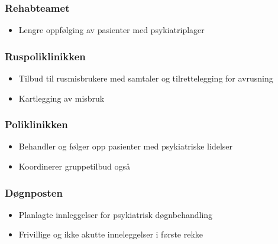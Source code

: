 \documentclass[11pt]{report} %
\begin{document}
                        \subsubsection{Rehabteamet}\label{sec:org_kdps_rehabliltering}
                          \begin{itemize}
                            \item Lengre oppfølging av pasienter med psykiatriplager\\
                          \end{itemize}
                        \subsubsection{Ruspoliklinikken}\label{sec:org_kdps_ruspol}
                          \begin{itemize}
                            \item Tilbud til rusmisbrukere med samtaler og tilrettelegging for avrusning\\
                            \item Kartlegging av misbruk\\
                          \end{itemize}
                        \subsubsection{Poliklinikken}\label{sec:org_kdps_poli}
                          \begin{itemize}
                            \item Behandler og følger opp pasienter med psykiatriske lidelser\\
                            \item Koordinerer gruppetilbud også\\
                          \end{itemize}
                        \subsubsection{Døgnposten}\label{sec:org_kdps_dogn}
                          \begin{itemize}
                            \item Planlagte innleggelser for psykiatrisk døgnbehandling\\
                            \item Frivillige og ikke akutte inneleggelser i første rekke\\
                          \end{itemize}  
\end{document}
